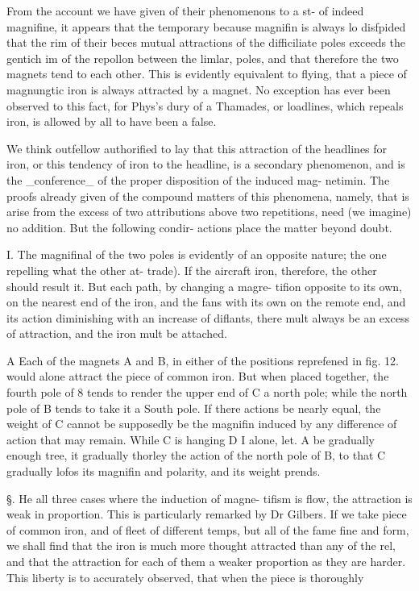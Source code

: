 \documentclass{article}
\begin{document}
From the account we have given of their phenomenons to a st-
of indeed magnifine, it appears that the temporary because
magnifin is always lo disfpided that the rim of their beces
mutual attractions of the difficiliate poles exceeds the
gentich
im of the repollon between the limlar, poles, and
that therefore the two magnets tend to each other.
This is evidently equivalent to flying, that a piece of
magnungtic iron is always attracted by a magnet. No
exception has ever been observed to this fact, for Phys's
dury of a Thamades, or loadlines, which repeals iron, is
allowed by all to have been a false.

We think outfellow authorified to lay that this attraction
of the headlines for iron, or this tendency of iron
to the headline, is a secondary phenomenon, and is the
\_conference\_ of the proper disposition of the induced mag-
netimin. The proofs already given of the compound
matters of this phenomena, namely, that is arise from
the excess of two attributions above two repetitions, need
(we imagine) no addition. But the following condir-
actions place the matter beyond doubt.

I. The magnifinal of the two poles is evidently of an
opposite nature; the one repelling what the other at-
trade). If the aircraft iron, therefore, the other
should result it. But each path, by changing a magre-
tifion opposite to its own, on the nearest end of the iron,
and the fans with its own on the remote end, and its
action diminishing with an increase of diflants, there
mult always be an excess of attraction, and the iron mult
be attached.

A Each of the magnets A and B, in either of the
positions reprefened in fig. 12. would alone attract the
piece of common iron. But when placed together,
the fourth pole of 8 tends to render the upper end of
C a north pole; while the north pole of B tends to
take it a South pole. If there actions be nearly equal,
the weight of C cannot be supposedly be the magnifin
induced by any difference of action that may remain.
While C is hanging D I alone, let. A be gradually
enough tree, it gradually thorley the action of the
north pole of B, to that C gradually lofos its magnifin
and polarity, and its weight prends.

§. He all three cases where the induction of magne-
tifism is flow, the attraction is weak in proportion. This
is particularly remarked by Dr Gilbers. If we take
piece of common iron, and of fleet of different temps,
but all of the fame fine and form, we shall find that the
iron is much more thought attracted than any of the
rel, and that the attraction for each of them a weaker
proportion as they are harder. This liberty is to
accurately observed, that when the piece is thoroughly
\end{document}
